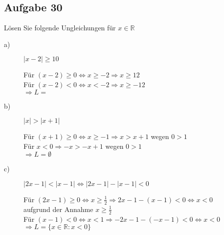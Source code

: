 \documentclass[12pt,a4paper,leqno]{article}
\begin{document}
\subsection*{Aufgabe 30}
Lösen Sie folgende Ungleichungen für $x \in \mathbb{R}$
\begin{description}
	\item[a)] $|x-2|\geq10 $ 
	
			Für $(x-2)\geq 0 \Leftrightarrow x \geq -2 \Rightarrow x  \geq 12$ \\
			Für $ (x-2) < 0 \Leftrightarrow x < -2 \Rightarrow  x \geq -12$ \\
			$\Rightarrow L=$
			
	\item[b)] $ |x| >|x+1|$
	
			Für $(x+1) \geq 0 \Leftrightarrow x \geq -1 \Rightarrow x > x+1 $ \blitze   wegen $ 0>1 $ \\    				Für $x<0 \Rightarrow -x > -x+1 $  \blitze   wegen $ 0>1 $ \\
						$ \Rightarrow L = \emptyset$
						
	\item[c)] $|2x -1|<|x-1| \Leftrightarrow |2x -1|-|x-1|<0 $ 
	
			Für $(2x-1)\geq 0 \Leftrightarrow x\geq \frac{1}{2} \Rightarrow 2x-1-(x-1)<0 \Leftrightarrow x<0$ \blitze \\ aufgrund der Annahme $x \geq \frac{1}{2}$\\			Für	$(x-1)<0 \Leftrightarrow x < 1 \Rightarrow -2x-1-(-x-1)<0 \Leftrightarrow x<0$	
			$\Rightarrow L =\lbrace x \in \mathbb{R}:x<0\rbrace $
\end{description} 
\end{document}

